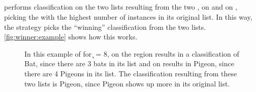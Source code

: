 \subsection{\rwinner{}}
\rwinner{} performs \kNN{} classification on the two \knnlong{} lists resulting from the two \compfuncs{}, \pcfunclabel{} on \Ssixt{} and \pcfunclabel{} on \Sfive{}, picking the \spec{} with the highest number of instances in its original list.
In this way, the strategy picks the ``winning'' classification from the two lists.
\autoref{fig:winner:example} shows how this works.

\begin{figure}
\centering
{}
\quad
{}
\caption{In this example of \rwinner{} for \k{} = 8, \kNN{} on the \Ssixt{} region results in a classification of Bat, since there are 3 bats in its \knnlong{} list and \kNN{} on \Sfive{} results in Pigeon, since there are 4 Pigeons in its \knnlong{} list. The classification resulting from these two lists is Pigeon, since Pigeon shows up more in its original list.}
\label{fig:winner:example}
\end{figure}

